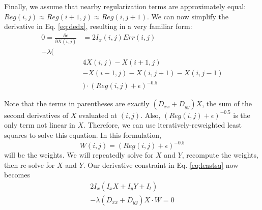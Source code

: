 \documentclass[10pt,twocolumn,letterpaper]{article}
\begin{document}
Finally, we assume that nearby regularization terms are approximately equal: $Reg(i, j) \approx Reg(i+1,j) \approx Reg(i,j+1)$.  We can now simplify the derivative in Eq. \ref{eq:dedx}, resulting in a very familiar form:
\begin{equation} \label{eq:leastsq}
\begin{aligned}
0 = \frac{\partial e}{\partial X(i, j)} &= 2I_x(i, j) Err(i, j)  \\
+\lambda(&\\
&4X(i, j) - X(i+1,j) \\
&- X(i-1,j) - X(i,j+1) - X(i,j-1) \\
&)\cdot (Reg(i, j) + \epsilon) ^{-0.5}
\end{aligned}
\end{equation}

Note that the terms in parentheses are exactly $(D_{xx} + D_{yy}) X$, the sum of the second derivatives of $X$ evaluated at $(i, j)$.  Also, $(Reg(i, j) + \epsilon)^{-0.5}$ is the only term not linear in $X$.  Therefore, we can use iteratively-reweighted least squares to solve this equation.  In this formulation,
\begin{equation} \label{eq:weights}
W(i,j) = (Reg(i,j) + \epsilon)^{-0.5}
\end{equation}
will be the weights.  We will repeatedly solve for $X$ and $Y$, recompute the weights, then re-solve for $X$ and $Y$.  Our derivative constraint in Eq. \ref{eq:leastsq} now becomes
\begin{equation} \label{eq:leastsqx}
\begin{aligned}
2I_x (I_x X + I_y Y + I_t) \\
 -\lambda(D_{xx} + D_{yy}) X \cdot W = 0
\end{aligned}
\end{equation}
\end{document}
